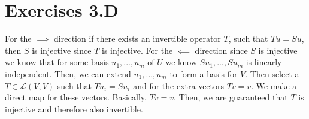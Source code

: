 \documentclass[10pt, twocolumn]{article}
\newcommand{\LinearMap}[2]{\mathcal{L}(#1, #2)}
\begin{document}
\section{Exercises 3.D}
\begin{q}[3]
    For the $ \implies $ direction if there exists an invertible operator $ T $, such that $ Tu = Su $, then $ S $ is injective since $ T $ is injective.
    For the $ \impliedby $ direction since $ S $ is injective we know that for some basis $ u_1, ..., u_m $ of $ U $ we know $ Su_1, ..., Su_m $ is linearly independent. 
    Then, we can extend $ u_1, ..., u_m $ to form a basis for $ V $. 
    Then select a $ T \in \LinearMap{V}{V} $ such that $ Tu_i = Su_i $ and for the extra vectors $ Tv = v $. 
    We make a direct map for these vectors. 
    Basically, $ Tv = v $. 
    Then, we are guaranteed that $ T $ is injective and therefore also invertible.  
\end{q}
\end{document}
